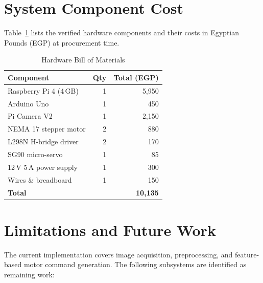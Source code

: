 \documentclass[conference]{IEEEtran}
\begin{document}
\section{System Component Cost}
\label{sec:cost}

Table~\ref{tab:bom} lists the verified hardware components and their costs
in Egyptian Pounds (EGP) at procurement time.

\begin{table}[htbp]
  \caption{Hardware Bill of Materials}
  \label{tab:bom}
  \begin{center}
    \begin{tabular}{lrr}
      \toprule
      \textbf{Component} & \textbf{Qty} & \textbf{Total (EGP)} \\
      \midrule
      Raspberry Pi 4 (4\,GB)  & 1 & 5,950 \\
      Arduino Uno              & 1 &   450 \\
      Pi Camera V2             & 1 & 2,150 \\
      NEMA 17 stepper motor    & 2 &   880 \\
      L298N H-bridge driver    & 2 &   170 \\
      SG90 micro-servo         & 1 &    85 \\
      12\,V 5\,A power supply  & 1 &   300 \\
      Wires \& breadboard      & 1 &   150 \\
      \midrule
      \textbf{Total}           &   & \textbf{10,135} \\
      \bottomrule
    \end{tabular}
  \end{center}
\end{table}

\section{Limitations and Future Work}
\label{sec:future}

The current implementation covers image acquisition, preprocessing, and
feature-based motor command generation. The following subsystems
are identified as remaining work:
\end{document}
